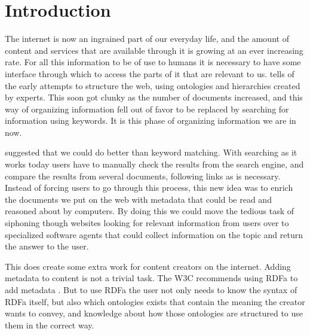 
\chapter{Introduction} %

\label{Introduction}



The internet is now an ingrained part of our everyday life,
and the amount of content and services that are available through it is growing at an ever increasing rate.
For all this information to be of use to humans it is necessary to have some interface through which to access the parts of it that are relevant to us.
\citet{Shirky2007} tells of the early attempts to structure the web,
using ontologies and hierarchies created by experts.
This soon got clunky as the number of documents increased,
and this way of organizing information fell out of favor to be replaced by searching for information using keywords.
It is this phase of organizing information we are in now.

\citet{Berners-Lee2001} suggested that we could do better than keyword matching.
With searching as it works today users have to manually check the results from the search engine,
and compare the results from several documents, following links as is necessary.
Instead of forcing users to go through this process,
this new idea was to enrich the documents we put on the web with metadata that could be read and reasoned about by computers.
By doing this we could move the tedious task of siphoning though websites looking for relevant information from users
over to specialized software agents that could collect information on the topic and return the answer to the user.

This does create some extra work for content creators on the internet.
Adding metadata to content is not a trivial task.
The W3C recommends using RDFa to add metadata \citep{Pemberton:08:RXS}.
But to use RDFa the user not only needs to know the syntax of RDFa itself,
but also which ontologies exists that contain the meaning the creator wants to convey,
and knowledge about how those ontologies are structured to use them in the correct way.

